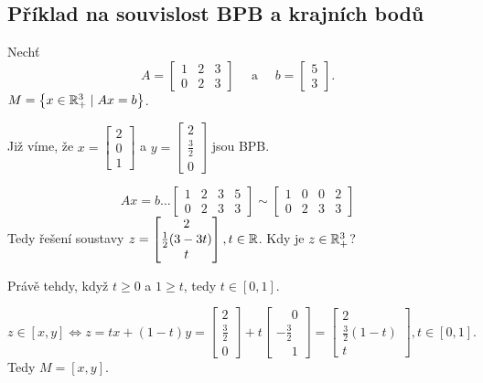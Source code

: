 \subsection{Příklad na souvislost BPB a krajních bodů}
Nechť
\[
    A =
    \begin{bmatrix}
    1 & 2 & 3 \\
    0 & 2 & 3
    \end{bmatrix} \quad \text{ a } \quad b =
    \begin{bmatrix}
        5 \\
        3
    \end{bmatrix}.
\]
$M = \left\lbrace x \in \mathbb{R}^3_+ \mid Ax = b \right\rbrace$.

Již víme, že $x =
\begin{bmatrix}
2 \\
0 \\
1
\end{bmatrix}$ a $y =
\begin{bmatrix}
    2 \\
    \frac{3}{2} \\
    0
\end{bmatrix}$ jsou BPB.

\[
    Ax = b \dots
    \left[
        \begin{array}{ccc|c}
        1 & 2 & 3 & 5 \\
        0 & 2 & 3 & 3
        \end{array}
    \right] \sim
    \left[
        \begin{array}{ccc|c}
        1 & 0 & 0 & 2 \\
        0 & 2 & 3 & 3
        \end{array}
    \right]
\]
Tedy řešení soustavy $z =
\begin{bmatrix}
2 \\
\frac{1}{2}(3-3t) \\
t
\end{bmatrix}, t \in \mathbb{R}$. Kdy je $z \in \mathbb{R}^3_+$?

Právě tehdy, když $t \geq 0$ a $1\geq t$, tedy $t \in [0,1]$.

\[
    z \in [x, y] \iff z = tx + (1-t)y =
    \begin{bmatrix}
        2 \\
        \frac{3}{2} \\
        0
    \end{bmatrix} + t
    \begin{bmatrix}
        \phantom{-}0 \\
        -\frac{3}{2} \\
        \phantom{-}1
    \end{bmatrix} =
    \begin{bmatrix}
        2 \\
        \frac{3}{2} (1-t) \\
        t
    \end{bmatrix}, t \in [0,1].
\]
Tedy $M = [x, y]$.

